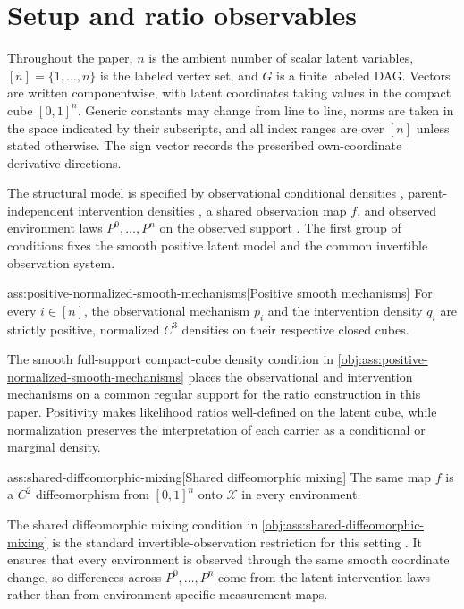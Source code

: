 \section{Setup and ratio observables}\label{sec:setup}

Throughout the paper, \(n\) is the ambient number of scalar latent variables, \([n]=\{1,\ldots,n\}\) is the labeled vertex set, and \(G\) is a finite labeled DAG. Vectors are written componentwise, with latent coordinates  taking values in the compact cube \([0,1]^n\). Generic constants may change from line to line, norms are taken in the space indicated by their subscripts, and all index ranges are over \([n]\) unless stated otherwise. The sign vector  records the prescribed own-coordinate derivative directions.

The structural model is specified by observational conditional densities , parent-independent intervention densities , a shared observation map \(f\), and observed environment laws \(P^0,\ldots,P^n\) on the observed support . The first group of conditions fixes the smooth positive latent model and the common invertible observation system.

\begin{assumptionv}{ass:positive-normalized-smooth-mechanisms}[Positive smooth mechanisms]
For every \(i\in[n]\), the observational mechanism \(p_i\) and the intervention density \(q_i\) are strictly positive, normalized \(C^3\) densities on their respective closed cubes.
\end{assumptionv}

The smooth full-support compact-cube density condition in \cref{obj:ass:positive-normalized-smooth-mechanisms} places the observational and intervention mechanisms on a common regular support for the ratio construction in this paper. Positivity makes likelihood ratios well-defined on the latent cube, while normalization preserves the interpretation of each carrier as a conditional or marginal density.

\begin{assumptionv}{ass:shared-diffeomorphic-mixing}[Shared diffeomorphic mixing]
The same map \(f\) is a \(C^2\) diffeomorphism from \([0,1]^n\) onto \(\mathcal X\) in every environment.
\end{assumptionv}

The shared diffeomorphic mixing condition in \cref{obj:ass:shared-diffeomorphic-mixing} is the standard invertible-observation restriction for this setting \citep{vonKugelgenEtAl2023UnknownInterventions}. It ensures that every environment is observed through the same smooth coordinate change, so differences across \(P^0,\ldots,P^n\) come from the latent intervention laws rather than from environment-specific measurement maps.


